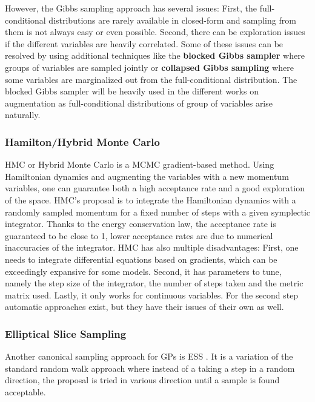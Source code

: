 However, the Gibbs sampling approach has several issues:
First, the full-conditional distributions are rarely available in closed-form and sampling from them is not always easy or even possible.
Second, there can be exploration issues if the different variables are heavily correlated.
Some of these issues can be resolved by using additional techniques like the \textbf{blocked Gibbs sampler} \needcite where groups of variables are sampled jointly or \textbf{collapsed Gibbs sampling} \cite{liu1994collapsed} where some variables are marginalized out from the full-conditional distribution.
The blocked Gibbs sampler will be heavily used in the different works on augmentation as full-conditional distributions of group of variables arise naturally.

\subsubsection{Hamilton/Hybrid Monte Carlo}
\label{sec:hmc}
\acf{HMC} or Hybrid Monte Carlo \cite{betancourt2017conceptual} is a \ac{MCMC} gradient-based method.
Using Hamiltonian dynamics and augmenting the variables with a new momentum variables, one can guarantee both a high acceptance rate and a good exploration of the space.
\ac{HMC}'s proposal is to integrate the Hamiltonian dynamics with a randomly sampled momentum for a fixed number of steps with a given symplectic integrator.
Thanks to the energy conservation law, the acceptance rate is guaranteed to be close to 1, lower acceptance rates are due to numerical inaccuracies of the integrator.
\ac{HMC} has also multiple disadvantages: 
First, one needs to integrate differential equations based on gradients, which can be exceedingly expansive for some models.
Second, it has parameters to tune, namely the step size of the integrator, the number of steps taken and the metric matrix used.
Lastly, it only works for continuous variables.
For the second step automatic approaches exist, but they have their issues of their own as well.


\subsubsection{Elliptical Slice Sampling}

Another canonical sampling approach for \ac{GPs} is \ac{ESS} \citet{murrayEllipticalSliceSampling2010}.
It is a variation of the standard random walk approach where instead of a taking a step in a random direction, the proposal is tried in various direction until a sample is found acceptable.

